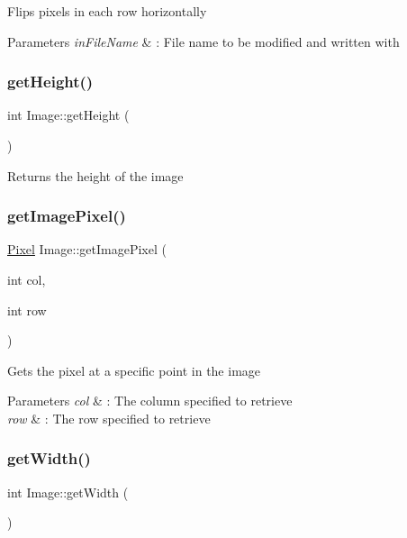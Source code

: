 Flips pixels in each row horizontally 
\begin{DoxyParams}{Parameters}
{\em in\+File\+Name} & \+: File name to be modified and written with \\
\hline
\end{DoxyParams}
\mbox{\label{classImage_aa4e1f064e5e1f3f04ad605408f1ec3af}} 
\subsubsection{\texorpdfstring{get\+Height()}{getHeight()}}
{\footnotesize\ttfamily int Image\+::get\+Height (\begin{DoxyParamCaption}{ }\end{DoxyParamCaption})}

Returns the height of the image \mbox{\label{classImage_a660ff0ed55722f4cfb9d1d511b379e2c}} 
\subsubsection{\texorpdfstring{get\+Image\+Pixel()}{getImagePixel()}}
{\footnotesize\ttfamily \hyperlink{structPixel}{Pixel} Image\+::get\+Image\+Pixel (\begin{DoxyParamCaption}\item[{int}]{col,  }\item[{int}]{row }\end{DoxyParamCaption})}

Gets the pixel at a specific point in the image 
\begin{DoxyParams}{Parameters}
{\em col} & \+: The column specified to retrieve \\
\hline
{\em row} & \+: The row specified to retrieve \\
\hline
\end{DoxyParams}
\mbox{\label{classImage_af2720a072812763395512fc3c8c21362}} 
\subsubsection{\texorpdfstring{get\+Width()}{getWidth()}}
{\footnotesize\ttfamily int Image\+::get\+Width (\begin{DoxyParamCaption}{ }\end{DoxyParamCaption})}

